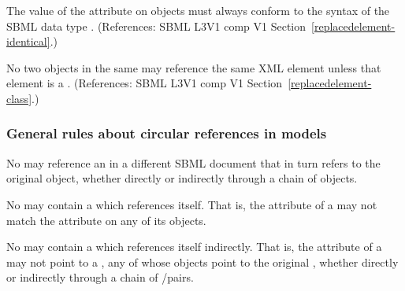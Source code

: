 \begin{sbmlenum}
 { The value of the  attribute on
  \ReplacedElement objects must always conform to the syntax of
  the SBML data type .
  (References: SBML L3V1 comp V1 Section~\ref{replacedelement-identical}.) }


 { No two \ReplacedElement objects in the same \Model
  may reference the same XML element unless that element is a \Deletion.
  (References: SBML L3V1 comp V1 Section~\ref{replacedelement-class}.) }
  







\end{sbmlenum} \subsubsection*{General rules about circular references in models} \begin{sbmlenum}

 { No \ExternalModelDefinition may reference an
  \ExternalModelDefinition in a different SBML document that in turn
  refers to the original \ExternalModelDefinition object, whether
  directly or indirectly through a chain of \ExternalModelDefinition objects.} 

 { No \Model may contain a \Submodel which references
  itself.  That is, the  attribute of a \Model may not match the
   attribute on any of its \Submodel objects.} 

 { No \Model may contain a \Submodel which references
  itself indirectly.  That is, the  attribute of a \Submodel may
  not point to a \Model, any of whose \Submodel objects point to the original
  \Model, whether directly or indirectly through a chain of
  \Model/\Submodel pairs.} 


\end{sbmlenum}
